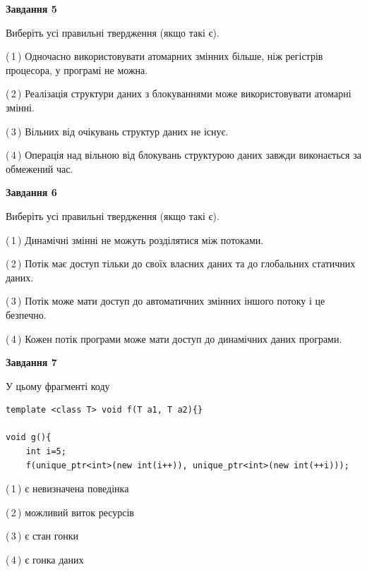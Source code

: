 \documentclass[12pt, ukrainian]{article}
\begin{document}
\begin {large}
{\begin{center}
\textbf{Завдання 5}
\end{center}

Виберіть усі правильні твердження (якщо такі є).\par
\vspace{2mm}

(\,1\,) Одночасно використовувати атомарних змінних більше, ніж регістрів процесора, у програмі не можна.%

(\,2\,) Реалізація структури даних з блокуваннями може використовувати атомарні змінні.%

(\,3\,) Вільних від очікувань структур даних не існує.%

(\,4\,) Операція над вільною від блокувань структурою даних завжди виконається за обмежений час.%
\newpage


\begin{center}
\textbf{Завдання 6}
\end{center}

Виберіть усі правильні твердження (якщо такі є).\par
\vspace{2mm}

(\,1\,) Динамічні змінні не можуть розділятися між потоками.%

(\,2\,) Потік має доступ тільки до своїх власних даних та до глобальних статичних даних.%

(\,3\,) Потік може мати доступ до автоматичних змінних іншого потоку і це безпечно.%

(\,4\,) Кожен потік програми може мати доступ до динамічних даних програми.%


\begin{center}
\textbf{Завдання 7}
\end{center}

У цьому фрагменті коду
\begin{verbatim}
template <class T> void f(T a1, T a2){}

void g(){
    int i=5;
    f(unique_ptr<int>(new int(i++)), unique_ptr<int>(new int(++i)));
\end{verbatim}

(\,1\,) є невизначена поведінка%

(\,2\,) можливий виток ресурсів%

(\,3\,) є стан гонки%

(\,4\,) є гонка даних%

}
\end {large}

\vspace{4mm}
\newpage
\end{document}
